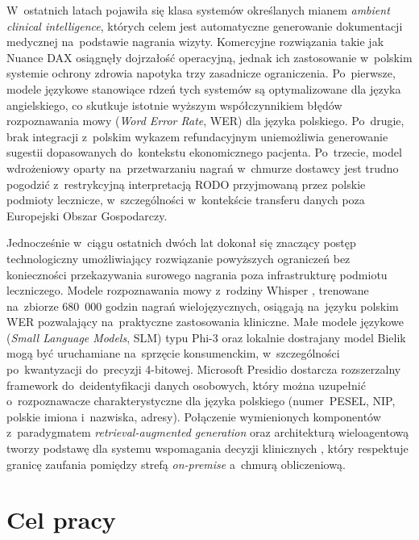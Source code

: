 W~ostatnich latach pojawiła się klasa systemów określanych mianem
\emph{ambient clinical intelligence}, których celem jest automatyczne
generowanie dokumentacji medycznej na~podstawie nagrania wizyty.
Komercyjne rozwiązania takie jak Nuance DAX \parencite{nuancedax2024}
osiągnęły dojrzałość operacyjną, jednak ich zastosowanie w~polskim
systemie ochrony zdrowia napotyka trzy zasadnicze ograniczenia.
Po~pierwsze, modele językowe stanowiące rdzeń tych systemów są
optymalizowane dla języka angielskiego, co skutkuje istotnie wyższym
współczynnikiem błędów rozpoznawania mowy (\emph{Word Error Rate}, WER)
dla języka polskiego. Po~drugie, brak integracji z~polskim wykazem
refundacyjnym uniemożliwia generowanie sugestii dopasowanych do~kontekstu
ekonomicznego pacjenta. Po~trzecie, model wdrożeniowy oparty
na~przetwarzaniu nagrań w~chmurze dostawcy jest trudno pogodzić
z~restrykcyjną interpretacją RODO przyjmowaną przez polskie podmioty
lecznicze, w~szczególności w~kontekście transferu danych poza
Europejski Obszar Gospodarczy.

Jednocześnie w~ciągu ostatnich dwóch lat dokonał się znaczący postęp
technologiczny umożliwiający rozwiązanie powyższych ograniczeń bez
konieczności przekazywania surowego nagrania poza infrastrukturę
podmiotu leczniczego. Modele rozpoznawania mowy z~rodziny Whisper
\parencite{radford2023whisper}, trenowane na~zbiorze 680~000 godzin
nagrań wielojęzycznych, osiągają na~języku polskim WER pozwalający
na~praktyczne zastosowania kliniczne. Małe modele językowe (\emph{Small
Language Models}, SLM) typu Phi-3 \parencite{abdin2024phi3} oraz lokalnie
dostrajany model Bielik \parencite{bielik2024} mogą być uruchamiane
na~sprzęcie konsumenckim, w~szczególności po~kwantyzacji do~precyzji
4-bitowej. Microsoft Presidio \parencite{presidio-docs} dostarcza
rozszerzalny framework do~deidentyfikacji danych osobowych, który
można uzupełnić o~rozpoznawacze charakterystyczne dla języka polskiego
(numer~PESEL, NIP, polskie imiona i~nazwiska, adresy). Połączenie
wymienionych komponentów z~paradygmatem \emph{retrieval-augmented
generation} \parencite{lewis2020rag} oraz architekturą wieloagentową
\parencite{langgraph2024} tworzy podstawę dla systemu wspomagania decyzji
klinicznych \parencite{sutton2020cdss}, który respektuje granicę
zaufania pomiędzy strefą \emph{on-premise} a~chmurą obliczeniową.

\section{Cel pracy}\label{sec:cel-pracy}

